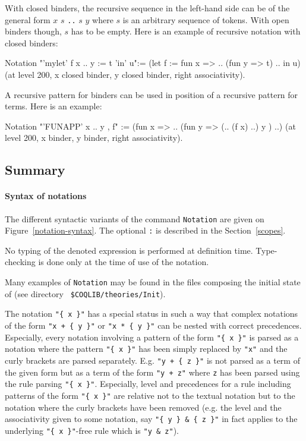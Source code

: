 With closed binders, the recursive sequence in the left-hand side can
be of the general form $x$ $s$ {\tt ..} $s$ $y$ where $s$ is an
arbitrary sequence of tokens. With open binders though, $s$ has to be
empty. Here is an example of recursive notation with closed binders:

\begin{coq_example*}
Notation "'mylet' f x .. y :=  t 'in' u":=
  (let f := fun x => .. (fun y => t) .. in u)
  (at level 200, x closed binder, y closed binder, right associativity).
\end{coq_example*}

A recursive pattern for binders can be used in position of a recursive
pattern for terms. Here is an example:

\begin{coq_example*}
Notation "'FUNAPP' x .. y , f" :=
  (fun x => .. (fun y => (.. (f x) ..) y ) ..)
  (at level 200, x binder, y binder, right associativity).
\end{coq_example*}

\subsection{Summary}

\paragraph{Syntax of notations}

The different syntactic variants of the command \texttt{Notation} are
given on Figure~\ref{notation-syntax}. The optional {\tt :{\scope}} is
described in the Section~\ref{scopes}.

\Rem No typing of the denoted expression is performed at definition
time. Type-checking is done only at the time of use of the notation.

\Rem Many examples of {\tt Notation} may be found in the files
composing the initial state of {\Coq} (see directory {\tt
\$COQLIB/theories/Init}).

\Rem The notation \verb="{ x }"= has a special status in such a way
that complex notations of the form \verb="x + { y }"= or
\verb="x * { y }"= can be nested with correct precedences. Especially,
every notation involving a pattern of the form \verb="{ x }"= is
parsed as a notation where the pattern \verb="{ x }"= has been simply
replaced by \verb="x"= and the curly brackets are parsed separately.
E.g. \verb="y + { z }"= is not parsed as a term of the given form but
as a term of the form \verb="y + z"= where \verb=z= has been parsed
using the rule parsing \verb="{ x }"=. Especially, level and
precedences for a rule including patterns of the form \verb="{ x }"=
are relative not to the textual notation but to the notation where the
curly brackets have been removed (e.g. the level and the associativity
given to some notation, say \verb="{ y } & { z }"= in fact applies to
the underlying \verb="{ x }"=-free rule which is \verb="y & z"=).

